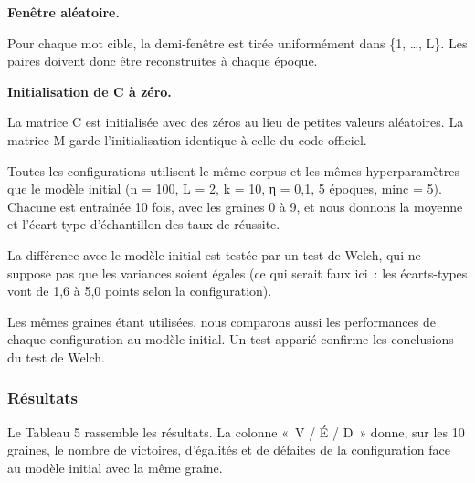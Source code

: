 \documentclass[11pt,a4paper]{article}
\begin{document}
\textbf{Fenêtre aléatoire.}\nopagebreak

Pour chaque mot cible, la demi-fenêtre est tirée uniformément dans \{1, …, L\}. Les paires doivent donc être reconstruites à chaque époque.

\textbf{Initialisation de C à zéro.}\nopagebreak

La matrice C est initialisée avec des zéros au lieu de petites valeurs aléatoires. La matrice M garde l’initialisation identique à celle du code officiel.

Toutes les configurations utilisent le même corpus et les mêmes hyperparamètres que le modèle initial (n = 100, L = 2, k = 10, η = 0,1, 5 époques, minc = 5). Chacune est entraînée 10 fois, avec les graines 0 à 9, et nous donnons la moyenne et l’écart-type d’échantillon des taux de réussite.

La différence avec le modèle initial est testée par un test de Welch, qui ne suppose pas que les variances soient égales (ce qui serait faux ici~: les écarts-types vont de 1,6 à 5,0 points selon la configuration).

Les mêmes graines étant utilisées, nous comparons aussi les performances de chaque configuration au modèle initial. Un test apparié confirme les conclusions du test de Welch.

\subsubsection{Résultats}

Le Tableau 5 rassemble les résultats. La colonne «~V / É / D~» donne, sur les 10 graines, le nombre de victoires, d’égalités et de défaites de la configuration face au modèle initial avec la même graine.
\end{document}
